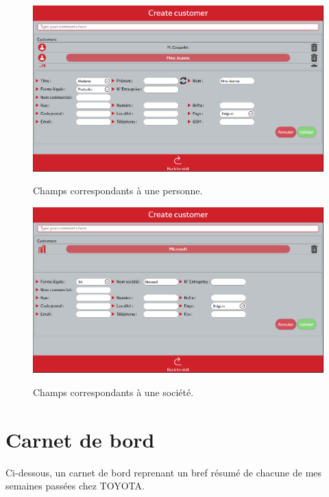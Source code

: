 \documentclass[12pt]{report}
\begin{document}
\begin{figure}[H]
	\caption{Champs correspondants à une personne.}
	\includegraphics[width=\linewidth]{img/image_customer_1}
	\label{image_customer_1}
\end{figure}

\begin{figure}[H]
	\caption{Champs correspondants à une société.}
	\includegraphics[width=\linewidth]{img/image_customer_2}
	\label{image_customer_2}
\end{figure}

\chapter{Carnet de bord}
Ci-dessous, un carnet de bord reprenant un bref résumé de chacune de mes semaines passées chez TOYOTA.















\end{document}
